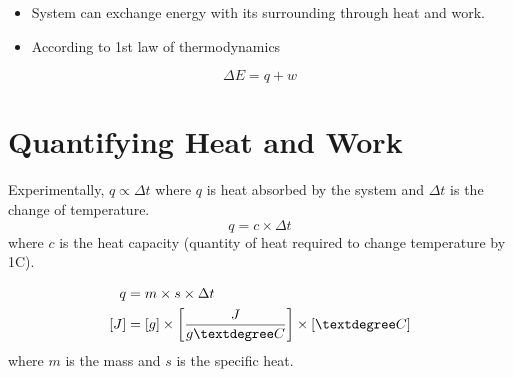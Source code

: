 \documentclass[
	chapter=6,
	title={Thermochemistry},
	showanswers=true,
]{chem122notes}
\begin{document}

\begin{itemize}
	\item System can exchange energy with its surrounding through heat and work.
	\item According to 1st law of thermodynamics
\end{itemize}
\begin{equation}
	\Delta E = q + w
	\label{eq:thermodynamics-first-law}
\end{equation}

\section{Quantifying Heat and Work}\label{sec:quantifying-heat-and-work}
Experimentally, $q\propto \Delta t$ where $q$ is heat absorbed by the system and $\Delta t$ is the change of temperature.
\begin{equation}
	q = c \times \Delta t
	\label{eq:heat-capacity}
\end{equation}
where $c$ is the heat capacity (quantity of heat required to change temperature by 1\textdegree{}C).

\begin{equation}
	\begin{aligned}
		q &= m \times s \times \Delta t\\
		[J] &= [g] \times \left[ \frac{J}{g\textdegree C} \right] \times [\textdegree C]
	\end{aligned}
	\label{eq:heat-mass}
\end{equation}
where $m$ is the mass and $s$ is the specific heat.

\end{document}
